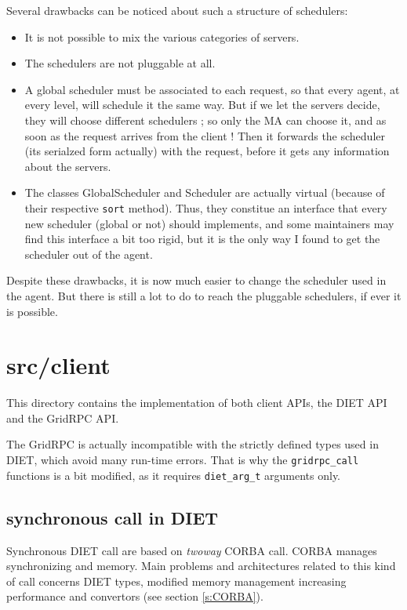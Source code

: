   Several drawbacks can be noticed about such a structure of schedulers:
  \begin{itemize}
  \item It is not possible to mix the various categories of servers.
  \item The schedulers are not pluggable at all.
  \item A global scheduler must be associated to each request, so that every
  agent, at every level, will schedule it the same way. But if we let the
  servers decide, they will choose different schedulers ; so only the MA can
  choose it, and as soon as the request arrives from the client ! Then it
  forwards the scheduler (its serialzed form actually) with the request, before
  it gets any information about the servers.
  \item The classes \textsf{GlobalScheduler} and \textsf{Scheduler} are actually
  virtual (because of their respective \texttt{sort} method). Thus, they
  constitue an interface that every new scheduler (global or not) should
  implements, and some maintainers may find this interface a bit too rigid, but
  it is the only way I found to get the scheduler out of the agent.
  \end{itemize}

  Despite these drawbacks, it is now much easier to change the scheduler used in
  the agent. But there is still a lot to do to reach the pluggable schedulers, if
  ever it is possible.

  \section{\textsf{src/client}}
  \label{s:client}

  This directory contains the implementation of both client APIs, the DIET API and
  the GridRPC API.

  The GridRPC is actually incompatible with the strictly defined types used in
  DIET, which avoid many run-time errors. That is why the \texttt{gridrpc\_call}
  functions is a bit modified, as it requires \texttt{diet\_arg\_t} arguments
  only.



  \subsection{synchronous call in DIET}
  Synchronous DIET call are based on \emph{twoway} CORBA call. CORBA manages synchronizing
  and memory. Main problems and architectures related to this kind of call concerns
  DIET types, modified memory management increasing performance and convertors (see section \ref{s:CORBA}).

